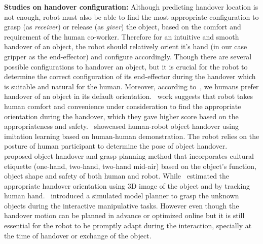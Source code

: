 \textbf{Studies on handover configuration:} Although predicting handover location is not enough, robot must also be able to find the most appropriate configuration to grasp (as \textit{receiver}) or release (as \textit{giver}) the object, based on the comfort and requirement of the human co-worker. Therefore for an intuitive and smooth handover of an object, the robot should relatively orient it's hand (in our case gripper as the end-effector) and configure accordingly. Though there are several possible configurations to handover an object, but it is crucial for the robot to determine the correct configuration of its end-effector during the handover which is suitable and natural for the human. Moreover, according to~\cite{cakmak2011human}, we humans prefer handover of an object in its default orientation.~\cite{aleotti2012comfortable} work suggests that robot takes human comfort and convenience under consideration to find the appropriate orientation during the handover, which they gave higher score based on the appropriateness and safety.~\cite{vogt2018one} showcased human-robot object handover using imitation learning based on human-human demonstration. The robot relies on the posture of human participant to determine the pose of object handover. ~\cite{kim2004advanced} proposed object handover and grasp planning method that incorporates cultural etiquette (one-hand, two-hand, two-hand mid-air) based on the object's function, object shape and safety of both human and robot. While~\cite{vezzani2017novel, song2013predicting, micelli2011perception} estimated the appropriate handover orientation using 3D image of the object and by tracking human hand.~\cite{lopez2006grasp} introduced a simulated model planner to grasp the unknown objects during the interactive manipulative tasks. However even though the handover motion can be planned in advance or optimized online but it is still essential for the robot to be promptly adapt during the interaction, specially at the time of handover or exchange of the object.


